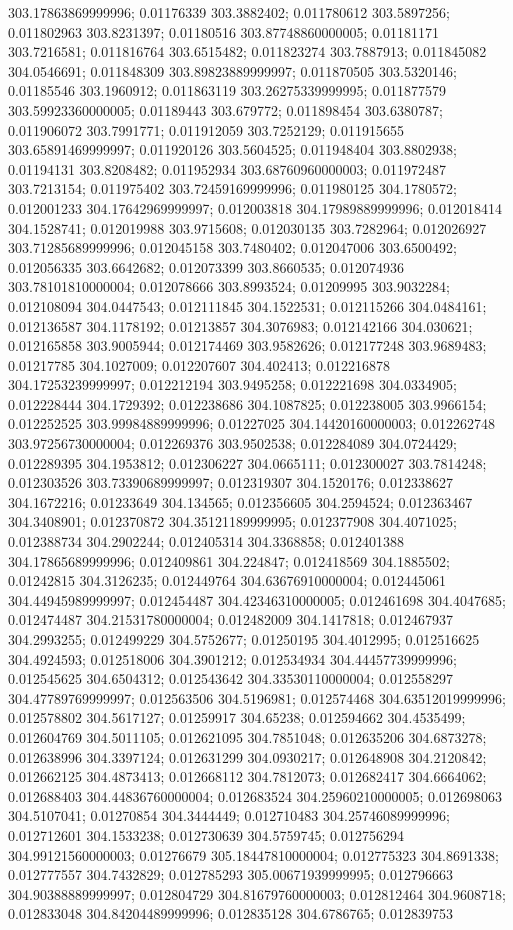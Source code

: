 303.17863869999996; 0.01176339 303.3882402; 0.011780612 303.5897256; 0.011802963 303.8231397; 0.01180516 303.87748860000005; 0.01181171 303.7216581; 0.011816764 303.6515482; 0.011823274 303.7887913; 0.011845082 304.0546691; 0.011848309 303.89823889999997; 0.011870505 303.5320146; 0.01185546 303.1960912; 0.011863119 303.26275339999995; 0.011877579 303.59923360000005; 0.01189443 303.679772; 0.011898454 303.6380787; 0.011906072 303.7991771; 0.011912059 303.7252129; 0.011915655 303.65891469999997; 0.011920126 303.5604525; 0.011948404 303.8802938; 0.01194131 303.8208482; 0.011952934 303.68760960000003; 0.011972487 303.7213154; 0.011975402 303.72459169999996; 0.011980125 304.1780572; 0.012001233 304.17642969999997; 0.012003818 304.17989889999996; 0.012018414 304.1528741; 0.012019988 303.9715608; 0.012030135 303.7282964; 0.012026927 303.71285689999996; 0.012045158 303.7480402; 0.012047006 303.6500492; 0.012056335 303.6642682; 0.012073399 303.8660535; 0.012074936 303.78101810000004; 0.012078666 303.8993524; 0.01209995 303.9032284; 0.012108094 304.0447543; 0.012111845 304.1522531; 0.012115266 304.0484161; 0.012136587 304.1178192; 0.01213857 304.3076983; 0.012142166 304.030621; 0.012165858 303.9005944; 0.012174469 303.9582626; 0.012177248 303.9689483; 0.01217785 304.1027009; 0.012207607 304.402413; 0.012216878 304.17253239999997; 0.012212194 303.9495258; 0.012221698 304.0334905; 0.012228444 304.1729392; 0.012238686 304.1087825; 0.012238005 303.9966154; 0.012252525 303.99984889999996; 0.01227025 304.14420160000003; 0.012262748 303.97256730000004; 0.012269376 303.9502538; 0.012284089 304.0724429; 0.012289395 304.1953812; 0.012306227 304.0665111; 0.012300027 303.7814248; 0.012303526 303.73390689999997; 0.012319307 304.1520176; 0.012338627 304.1672216; 0.01233649 304.134565; 0.012356605 304.2594524; 0.012363467 304.3408901; 0.012370872 304.35121189999995; 0.012377908 304.4071025; 0.012388734 304.2902244; 0.012405314 304.3368858; 0.012401388 304.17865689999996; 0.012409861 304.224847; 0.012418569 304.1885502; 0.01242815 304.3126235; 0.012449764 304.63676910000004; 0.012445061 304.44945989999997; 0.012454487 304.42346310000005; 0.012461698 304.4047685; 0.012474487 304.21531780000004; 0.012482009 304.1417818; 0.012467937 304.2993255; 0.012499229 304.5752677; 0.01250195 304.4012995; 0.012516625 304.4924593; 0.012518006 304.3901212; 0.012534934 304.44457739999996; 0.012545625 304.6504312; 0.012543642 304.33530110000004; 0.012558297 304.47789769999997; 0.012563506 304.5196981; 0.012574468 304.63512019999996; 0.012578802 304.5617127; 0.01259917 304.65238; 0.012594662 304.4535499; 0.012604769 304.5011105; 0.012621095 304.7851048; 0.012635206 304.6873278; 0.012638996 304.3397124; 0.012631299 304.0930217; 0.012648908 304.2120842; 0.012662125 304.4873413; 0.012668112 304.7812073; 0.012682417 304.6664062; 0.012688403 304.44836760000004; 0.012683524 304.25960210000005; 0.012698063 304.5107041; 0.01270854 304.3444449; 0.012710483 304.25746089999996; 0.012712601 304.1533238; 0.012730639 304.5759745; 0.012756294 304.99121560000003; 0.01276679 305.18447810000004; 0.012775323 304.8691338; 0.012777557 304.7432829; 0.012785293 305.00671939999995; 0.012796663 304.90388889999997; 0.012804729 304.81679760000003; 0.012812464 304.9608718; 0.012833048 304.84204489999996; 0.012835128 304.6786765; 0.012839753 